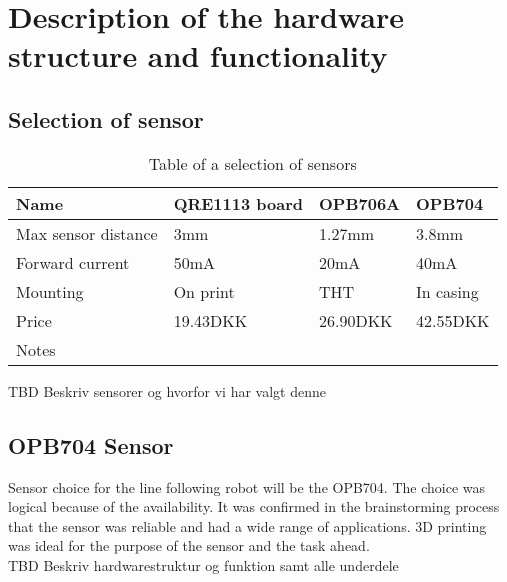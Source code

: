 \section{Description of the hardware structure and functionality}
\subsection{Selection of sensor}
\begin{table}[htbp]
    \begin{tabular}{|l|l|l|l|}
        \hline
        Name                & QRE1113 board & OPB706A  & OPB704    \\ \hline
        Max sensor distance & 3mm                            & 1.27mm   & 3.8mm     \\ \hline
        Forward current     & 50mA                           & 20mA     & 40mA      \\ \hline
        Mounting            & On print                       & THT      & In casing \\ \hline
        Price               & 19.43DKK                       & 26.90DKK & 42.55DKK  \\ \hline
        Notes               & ~                              & ~        & ~         \\
        \hline
    \end{tabular}
    \caption{Table of a selection of sensors}
\label{sensor_tabel}
\end{table}
TBD Beskriv sensorer og hvorfor vi har valgt denne
\newline
\subsection{OPB704 Sensor}
Sensor choice for the line following robot will be the OPB704. The choice was logical because of the availability. It was confirmed in the brainstorming process that the sensor was reliable and had a wide range of applications. 3D printing was ideal for the purpose of the sensor and the task ahead.
\newline 
\\
TBD Beskriv hardwarestruktur og funktion samt alle underdele
